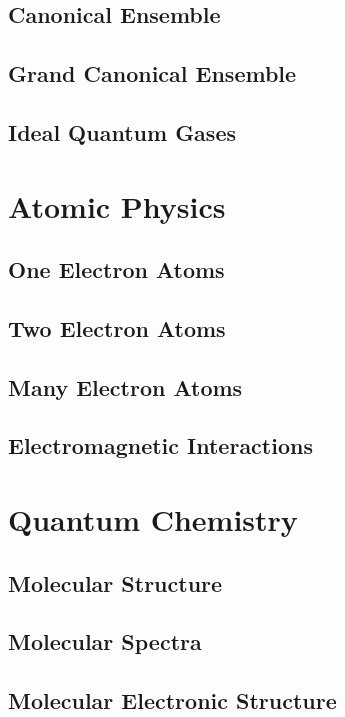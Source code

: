 \documentclass[a4paper, 11pt]{book}
\newcommand{\1}{\opr{\mathds{1}}}
\theoremstyle{definition}
\theoremstyle{remark}
\begin{document}
	\chapter{Canonical Ensemble}
		
	\chapter{Grand Canonical Ensemble}
		
	\chapter{Ideal Quantum Gases}
		
\part{Atomic Physics}
	\chapter{One Electron Atoms}
		
	\chapter{Two Electron Atoms}
		
	\chapter{Many Electron Atoms}
		
	\chapter{Electromagnetic Interactions}
		
\part{Quantum Chemistry}
	\chapter{Molecular Structure}
		
	\chapter{Molecular Spectra}
		
	\chapter{Molecular Electronic Structure}
		
\end{document}

